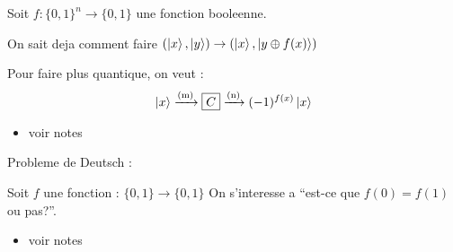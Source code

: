 Soit \(f:\{0,1\}^n \to \{0,1\}\) une fonction booleenne.

On sait deja comment faire
\((\left|{x}\right\rangle ,\left|{y}\right\rangle) \to (\left|{x}\right\rangle, \left|{y\oplus f(x)}\right\rangle)\)

Pour faire plus quantique, on veut : \[
\left|{x}\right\rangle \xrightarrow{\text{(m)}} \boxed{C} \xrightarrow{\text{(n)}} (-1)^{f(x)}\left|{x}\right\rangle
\]

\begin{itemize}
\tightlist
\item
  voir notes
\end{itemize}

Probleme de Deutsch :

Soit \(f\) une fonction : \(\{0,1\} \to \{0,1\}\) On s'interesse a
``est-ce que \(f(0)=f(1)\) ou pas?''.

\begin{itemize}
\tightlist
\item
  voir notes
\end{itemize}
